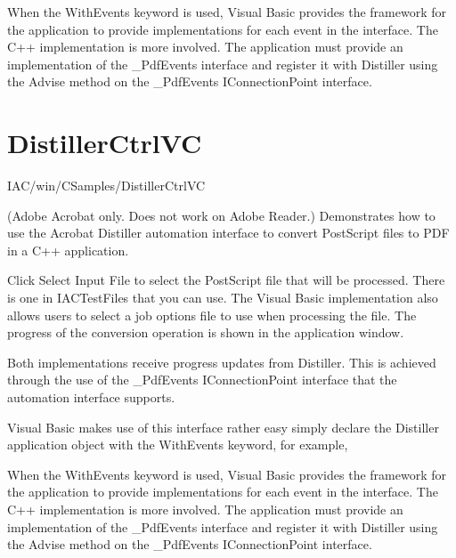 \documentclass[letterpaper,12pt,english,openany,oneside]{sphinxmanual}
\begin{document}
When the WithEvents keyword is used, Visual Basic provides the framework for the application to provide implementations for each event in the interface. The C++ implementation is more involved. The application must provide an implementation of the \_PdfEvents interface and register it with Distiller using the Advise method on the \_PdfEvents IConnectionPoint interface.


\section{DistillerCtrlVC}
\label{\detokenize{Samples_WindowsIAC:distillerctrlvc}}\label{\detokenize{Samples_WindowsIAC:location-12}}

IAC/win/CSamples/DistillerCtrlVC

\label{\detokenize{Samples_WindowsIAC:description-12}}

(Adobe Acrobat only. Does not work on Adobe Reader.) Demonstrates how to use the Acrobat Distiller automation interface to convert PostScript files to PDF in a C++ application.

\label{\detokenize{Samples_WindowsIAC:usage-8}}

Click Select Input File to select the PostScript file that will be processed. There is one in IACTestFiles that you can use. The Visual Basic implementation also allows users to select a job options file to use when processing the file. The progress of the conversion operation is shown in the application window.

\label{\detokenize{Samples_WindowsIAC:implementation-details-2}}

Both implementations receive progress updates from Distiller. This is achieved through the use of the \_PdfEvents IConnectionPoint interface that the automation interface supports.

Visual Basic makes use of this interface rather easy \sphinxhyphen{} simply declare the Distiller application object with the WithEvents keyword, for example, 

When the WithEvents keyword is used, Visual Basic provides the framework for the application to provide implementations for each event in the interface. The C++ implementation is more involved. The application must provide an implementation of the \_PdfEvents interface and register it with Distiller using the Advise method on the \_PdfEvents IConnectionPoint interface.
\end{document}
